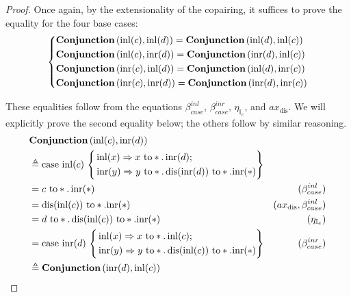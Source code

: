 \begin{proof}
 Once again, by the extensionality of the copairing, it suffices to prove the equality for the four base cases:
 \[
      \left\{
      \begin{aligned}
      &   \textbf{Conjunction} \, (\mathrm{inl}(c), \mathrm{inl}(d)) =  \textbf{Conjunction} \, (\mathrm{inl}(d), \mathrm{inl}(c))  \\
      &  \textbf{Conjunction} \, (\mathrm{inl}(c), \mathrm{inr}(d)) =  \textbf{Conjunction} \, (\mathrm{inr}(d), \mathrm{inl}(c))  \\
      & \textbf{Conjunction} \, (\mathrm{inr}(c), \mathrm{inl}(d)) =  \textbf{Conjunction} \, (\mathrm{inl}(d), \mathrm{inr}(c))  \\
      &   \textbf{Conjunction} \, (\mathrm{inr}(c), \mathrm{inr}(d)) =  \textbf{Conjunction} \, (\mathrm{inr}(d), \mathrm{inr}(c))  
      \end{aligned}
      \right.
      \]

These equalities follow from the equations 
\(\beta_{case}^{inl}\), \(\beta_{case}^{inr}\), \(\eta_{\mathbb{I}_e}\), and \(ax_\text{dis}\). 
We will explicitly prove the second equality below; the others follow by similar reasoning.
  \begin{align*}
     &   \textbf{Conjunction} \, (\mathrm{inl}(c), \mathrm{inr}(d)) \\
     &  \triangleq \text{case } \mathrm{inl}(c)\,
  \left\{
    \begin{aligned}
    &\mathrm{inl}(x) \Rightarrow x \text{ to} *. \, \mathrm{inr}(d) ;\\
  \,& \mathrm{inr}(y) \Rightarrow y \text{ to} *. \,  \text{dis}(\mathrm{inr}(d)) \text{ to} *. \mathrm{inr}(*)
  \end{aligned} 
  \right\} \\
  & = c \text{  to} *. \, \mathrm{inr}(*) &  (\beta_{case}^{inl}) \\
  & =  \text{dis}(\mathrm{inl}(c)) \text{ to} *. \mathrm{inr}(*) & (ax_\text{dis}, \beta_{case}^{inl}) \\
  &= d \text{  to} *. \, \text{dis}(\mathrm{inl}(c)) \text{ to} *. \mathrm{inr}(*) & (\eta_{\mathbb{I}_e}) \\
  & = \text{case } \mathrm{inr}(d)\, \left\{ \begin{aligned}
    &\mathrm{inl}(x) \Rightarrow x \text{ to} *. \, \mathrm{inl}(c) ;\\
  \,& \mathrm{inr}(y) \Rightarrow y \text{ to} *. \,  \text{dis}(\mathrm{inl}(c)) \text{ to} *. \mathrm{inr}(*)
  \end{aligned} \right\} & (\beta_{case}^{inr}) \\
  & \triangleq \textbf{Conjunction} \, (\mathrm{inr}(d), \mathrm{inl}(c))
\end{align*}
\end{proof}



